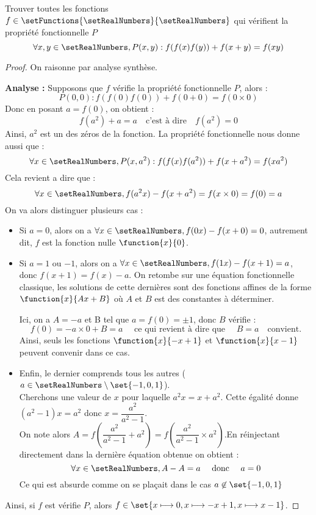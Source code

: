 \begin{exercice}
Trouver toutes les fonctions $f \in \setFunctions{\setRealNumbers}{\setRealNumbers}$ qui vérifient la propriété fonctionnelle $P$
\[
\forall x, y \in \setRealNumbers, P(x, y): f(f(x)f(y))+f(x+y)=f(xy)
\]
\end{exercice}

\begin{proof}
On raisonne par analyse synthèse.

\textbf{Analyse :} Supposons que $f$ vérifie la propriété fonctionnelle $P$, alors :\\
\[
P(0, 0) : f(f(0)f(0)) + f(0 + 0) = f(0 \times 0)
\]
Donc en posant $a = f(0)$, on obtient :
\[
f(a^2) + a = a \quad\text{c'est à dire}\quad f(a^2)=0
\]
Ainsi, $a^2$ est un des zéros de la fonction. La propriété fonctionnelle nous donne aussi que :
\[
\forall x \in \setRealNumbers, P(x, a^2) : f(f(x)f(a^2)) + f(x + a^2)= f(x a^2)
\]
Cela revient a dire que :
\[
\forall x \in \setRealNumbers, f(a^2 x) - f(x + a^2) = f( x \times 0) = f(0) = a
\]
On va alors distinguer plusieurs cas : 
\begin{itemize}
\item Si $a = 0$, alors on a $\forall x \in \setRealNumbers, f(0 x) - f(x + 0) = 0$, autrement dit, $f$ est la fonction nulle $\function{x}{0}$.
\item Si $a = 1$ ou $-1$, alors on a $\forall x \in \setRealNumbers, f(1 x) - f(x + 1) = a$, donc $f(x + 1) = f(x) - a$. On retombe sur une équation fonctionnelle classique, les solutions de cette dernières sont des fonctions affines de la forme $\function{x}{A x + B}$ où $A$ et $B$ est des constantes à déterminer.

Ici, on a $A = -a$ et B tel que $a = f(0) = \pm 1$, donc $B$ vérifie :
\[
f(0) = -a \times 0 + B = a \quad\text{ ce qui revient à dire que }\quad B = a \quad\text{convient.}
\]
Ainsi, seuls les fonctions $\function{x}{-x + 1}$ et $\function{x}{x - 1}$ peuvent convenir dans ce cas. 

\item Enfin, le dernier comprends tous les autres ($a \in \setRealNumbers \setminus \set{-1, 0, 1}$). \\
Cherchons une valeur de $x$ pour laquelle $a^2 x = x + a^2$. Cette égalité donne $(a^2 - 1)x = a^2$ donc $x = \dfrac{a^2}{a^2 - 1}$. \\
On note alors $A = f\left(\dfrac{a^2}{a^2 - 1} + a^2\right) = f\left(\dfrac{a^2}{a^2 - 1} \times a^2\right)$.En réinjectant directement dans la dernière équation obtenue on obtient :
\[
\forall x \in \setRealNumbers, A - A = a \quad\text{ donc }\quad a = 0
\]
Ce qui est absurde comme on se plaçait dans le cas $a \not\in \set{-1, 0, 1}$
\end{itemize}
Ainsi, si $f$ est vérifie $P$, alors $f\in \set{x \longmapsto 0, x \longmapsto - x + 1, x \longmapsto x - 1}$.


\end{proof}
